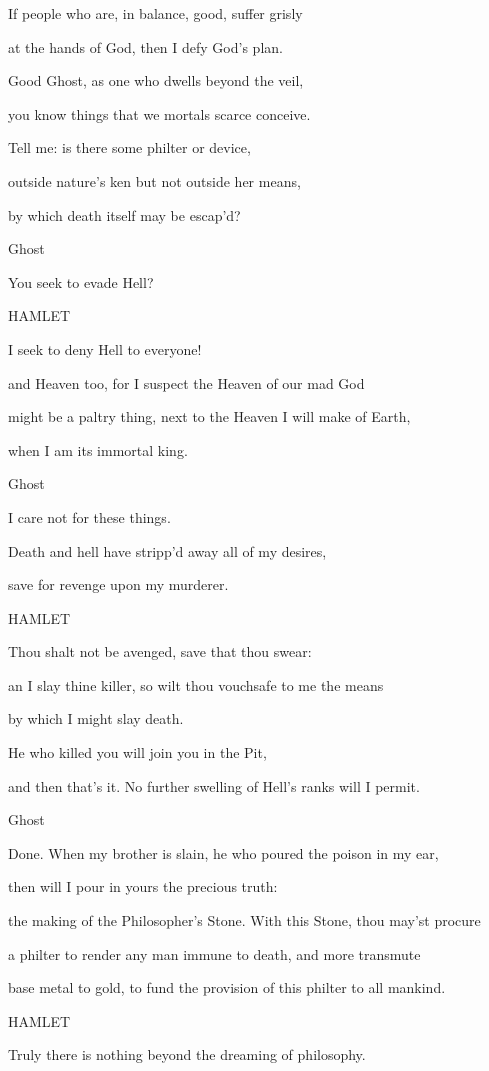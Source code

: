 If people who are, in balance, good, suffer grisly

at the hands of God, then I defy God's plan.

Good Ghost, as one who dwells beyond the veil,

you know things that we mortals scarce conceive.

Tell me: is there some philter or device,

outside nature's ken but not outside her means,

by which death itself may be escap'd?

Ghost

You seek to evade Hell?

HAMLET

I seek to deny Hell to everyone!

and Heaven too, for I suspect the Heaven of our mad God

might be a paltry thing, next to the Heaven I will make of Earth,

when I am its immortal king.

Ghost

I care not for these things.

Death and hell have stripp'd away all of my desires,

save for revenge upon my murderer.

HAMLET

Thou shalt not be avenged, save that thou swear:

an I slay thine killer, so wilt thou vouchsafe to me the means

by which I might slay death.

He who killed you will join you in the Pit,

and then that's it. No further swelling of Hell's ranks will I permit.

Ghost

Done. When my brother is slain, he who poured the poison in my ear,

then will I pour in yours the precious truth:

the making of the Philosopher's Stone. With this Stone, thou may'st
procure

a philter to render any man immune to death, and more transmute

base metal to gold, to fund the provision of this philter to all
mankind.

HAMLET

Truly there is nothing beyond the dreaming of philosophy.

